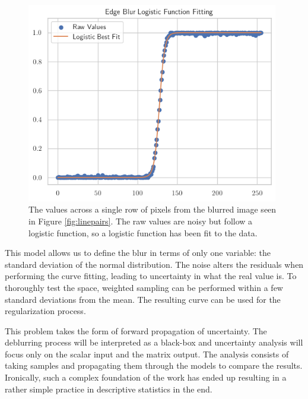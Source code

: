 \documentclass[letterpaper, 11pt, titlepage, twocolumn]{article}
\begin{document}
\begin{figure}[H]
  \centering
  \includegraphics[width=11cm]{edgefit.png}
  \caption{The values across a single row of pixels from the blurred image seen in Figure \ref{fig:linepairs}. The raw values are noisy but follow a logistic function, so a logistic function has been fit to the data.}
  \label{fig:esf}
\end{figure}

This model allows us to define the blur in terms of only one variable: the standard deviation of the normal distribution. The noise alters the residuals when performing the curve fitting, leading to uncertainty in what the real value is. To thoroughly test the space, weighted sampling can be performed within a few standard deviations from the mean. The resulting curve can be used for the regularization process.

This problem takes the form of forward propagation of uncertainty. The deblurring process will be interpreted as a black-box and uncertainty analysis will focus only on the scalar input and the matrix output. The analysis consists of taking samples and propagating them through the models to compare the results. Ironically, such a complex foundation of the work has ended up resulting in a rather simple practice in descriptive statistics in the end. 
\end{document}
